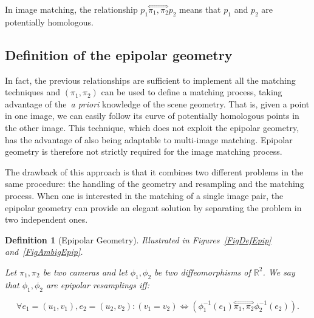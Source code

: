\documentclass{ipol}
\newcommand{\RR}{\ensuremath{\mathbb{R}}}
\newcommand{\HComp}{\overset{\Longleftrightarrow}{\scriptscriptstyle \pi_1,\pi_2}}
\newtheorem{definition}{Definition}
\begin{document}
\noindent In image matching, the relationship $p_1 \HComp p_2$  means that $p_1$ and $p_2$ are potentially homologous.




\subsection{Definition of the epipolar geometry}

In fact, the previous relationships are sufficient to implement all the matching techniques and
$(\pi_1,\pi_2)$ can be used to define a matching process, taking advantage
of the~\emph{a priori} knowledge of the scene geometry. That is, given a point in one image, we can easily
follow its curve of potentially homologous points in the other image.
This technique, which does not exploit the epipolar geometry, has the advantage of also being adaptable to multi-image matching. Epipolar geometry is therefore not strictly required for the image matching process.

The drawback of this approach is that it combines two different problems in the same procedure: the handling of the geometry and resampling and
the matching process. When one is interested
in the matching of a single image pair, the epipolar geometry
can provide an elegant solution by separating the problem in two independent ones. 


\begin{definition}[Epipolar Geometry]
\emph{Illustrated in Figures~\ref{FigDefEpip} and~\ref{FigAmbigEpip}.}

Let $\pi_1,\pi_2$ be two cameras and let $\phi_1,\phi_2$  be two diffeomorphisms
of $\RR^2$. We say that $\phi_1,\phi_2$ are epipolar resamplings iff:

\begin{equation}
  \forall e_1=(u_1,v_1) , e_2=(u_2,v_2) : (v_1=v_2)   \Leftrightarrow  (\phi_1^{-1}(e_1) \HComp \phi_2^{-1}(e_2)).
\end{equation}
   \label{EqEpiEgalY}
\end{definition}
\end{document}
